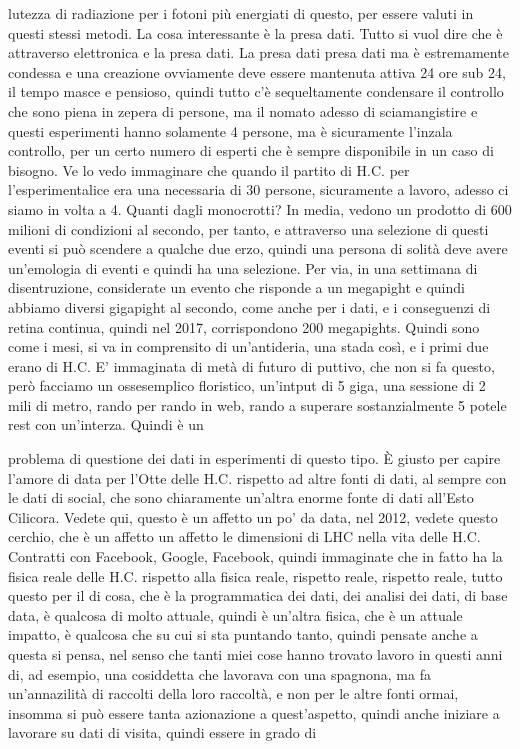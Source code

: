 lutezza di radiazione per i fotoni più energiati di questo, per essere valuti in questi stessi metodi. La cosa interessante è la presa dati. Tutto si vuol dire che è attraverso elettronica e la presa dati. La presa dati presa dati ma è estremamente condessa e una creazione ovviamente deve essere mantenuta attiva 24 ore sub 24, il tempo masce e pensioso, quindi tutto c'è sequeltamente condensare il controllo che sono piena in zepera di persone, ma il nomato adesso di sciamangistire e questi esperimenti hanno solamente 4 persone, ma è sicuramente l'inzala controllo, per un certo numero di esperti che è sempre disponibile in un caso di bisogno. Ve lo vedo immaginare che quando il partito di H.C. per l'esperimentalice era una necessaria di 30 persone, sicuramente a lavoro, adesso ci siamo in volta a 4. Quanti dagli monocrotti? In media, vedono un prodotto di 600 milioni di condizioni al secondo, per tanto, e attraverso una selezione di questi eventi si può scendere a qualche due erzo, quindi una persona di solità deve avere un'emologia di eventi e quindi ha una selezione. Per via, in una settimana di disentruzione, considerate un evento che risponde a un megapight e quindi abbiamo diversi gigapight al secondo, come anche per i dati, e i conseguenzi di retina continua, quindi nel 2017, corrispondono 200 megapights. Quindi sono come i mesi, si va in comprensito di un'antideria, una stada così, e i primi due erano di H.C. E' immaginata di metà di futuro di puttivo, che non si fa questo, però facciamo un ossesemplico floristico, un'intput di 5 giga, una sessione di 2 mili di metro, rando per rando in web, rando a superare sostanzialmente 5 potele rest con un'interza. Quindi è un 

problema di questione dei dati in esperimenti di questo tipo. È giusto per capire l'amore di data per l'Otte delle H.C. rispetto ad altre fonti di dati, al sempre con le dati di social, che sono chiaramente un'altra enorme fonte di dati all'Esto Cilicora. Vedete qui, questo è un affetto un po' da data, nel 2012, vedete questo cerchio, che è un affetto un affetto le dimensioni di LHC nella vita delle H.C. Contratti con Facebook, Google, Facebook, quindi immaginate che in fatto ha la fisica reale delle H.C. rispetto alla fisica reale, rispetto reale, rispetto reale, tutto questo per il di cosa, che è la programmatica dei dati, dei analisi dei dati, di base data, è qualcosa di molto attuale, quindi è un'altra fisica, che è un attuale impatto, è qualcosa che su cui si sta puntando tanto, quindi pensate anche a questa si pensa, nel senso che tanti miei cose hanno trovato lavoro in questi anni di, ad esempio, una cosiddetta che lavorava con una spagnona, ma fa un'annazilità di raccolti della loro raccoltà, e non per le altre fonti ormai, insomma si può essere tanta azionazione a quest'aspetto, quindi anche iniziare a lavorare su dati di visita, quindi essere in grado di 


